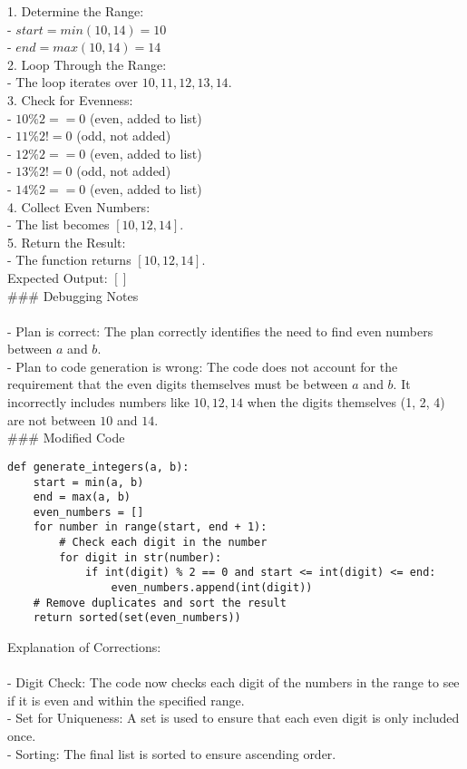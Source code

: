 1. \*\*Determine the Range:\*\* \\
   - $start = min(10, 14) = 10$ \\
   - $end = max(10, 14) = 14$ \\

2. \*\*Loop Through the Range:\*\* \\
   - The loop iterates over $10, 11, 12, 13, 14$. \\

3. \*\*Check for Evenness:\*\* \\
   - $10 \% 2 == 0$ (even, added to list) \\
   - $11 \% 2 != 0$ (odd, not added) \\
   - $12 \% 2 == 0$ (even, added to list) \\
   - $13 \% 2 != 0$ (odd, not added) \\
   - $14 \% 2 == 0$ (even, added to list) \\

4. \*\*Collect Even Numbers:\*\* \\
   - The list becomes $[10, 12, 14]$. \\

5. \*\*Return the Result:\*\* \\
   - The function returns $[10, 12, 14]$. \\

\*\*Expected Output:\*\* $[]$ \\

\#\#\# Debugging Notes \\
 \\
- \*\*Plan is correct\*\*: The plan correctly identifies the need to find even numbers between $a$ and $b$. \\
- \*\*Plan to code generation is wrong\*\*: The code does not account for the requirement that the even digits themselves must be between $a$ and $b$. It incorrectly includes numbers like $10, 12, 14$ when the digits themselves (1, 2, 4) are not between $10$ and $14$. \\

\#\#\# Modified Code \\
\begin{verbatim}
def generate_integers(a, b):
    start = min(a, b)
    end = max(a, b)
    even_numbers = []
    for number in range(start, end + 1):
        # Check each digit in the number
        for digit in str(number):
            if int(digit) % 2 == 0 and start <= int(digit) <= end:
                even_numbers.append(int(digit))
    # Remove duplicates and sort the result
    return sorted(set(even_numbers))
\end{verbatim}

\*\*Explanation of Corrections:\*\* \\
 \\
- \*\*Digit Check\*\*: The code now checks each digit of the numbers in the range to see if it is even and within the specified range. \\
- \*\*Set for Uniqueness\*\*: A set is used to ensure that each even digit is only included once. \\
- \*\*Sorting\*\*: The final list is sorted to ensure ascending order. \\
